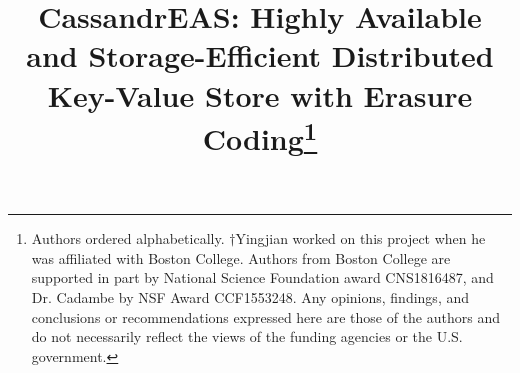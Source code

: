 \documentclass[conference]{IEEEtran}
\newcommand{\treasmod}{{\sc Treas-opt}}
\begin{document}
	\date{}
	
	\title{CassandrEAS: Highly Available and Storage-Efficient Distributed Key-Value Store with Erasure Coding\thanks{\noindent *Authors ordered alphabetically. $\dagger$Yingjian worked on this project when he was affiliated with Boston College. Authors from Boston College are supported in part by National Science Foundation award CNS1816487, and Dr. Cadambe by NSF Award CCF1553248. Any opinions, findings, and conclusions or recommendations expressed here are those of the authors and do not necessarily reflect the views of the funding agencies or the U.S. government.}}
	
\end{document}
